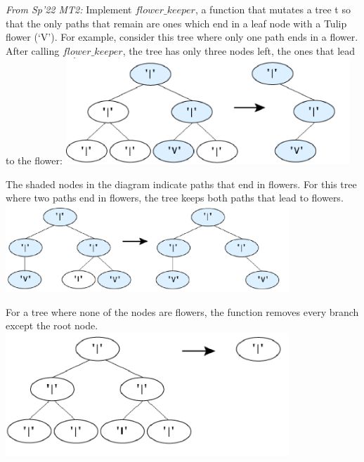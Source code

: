 \question \textit{From Sp'22 MT2:}  \newline Implement $flower\_keeper$, a function that mutates a tree t so that the only paths that remain are ones which
end in a leaf node with a Tulip flower (‘V’).
For example, consider this tree where only one path ends in a flower. After calling $flower\_keeper$, the tree has
only three nodes left, the ones that lead to the flower:
\newline
\includegraphics[width=0.8\textwidth]{three-nodes.png}
\newline
\newline

The shaded nodes in the diagram indicate paths that end in flowers.
For this tree where two paths end in flowers, the tree keeps both paths that lead to flowers.
\newline
\includegraphics[width=0.8\textwidth]{five-nodes.png}
\newline
\newline

For a tree where none of the nodes are flowers, the function removes every branch except the root node.
\newline
\includegraphics[width=0.8\textwidth]{white-root.png}
\newline
\newline

